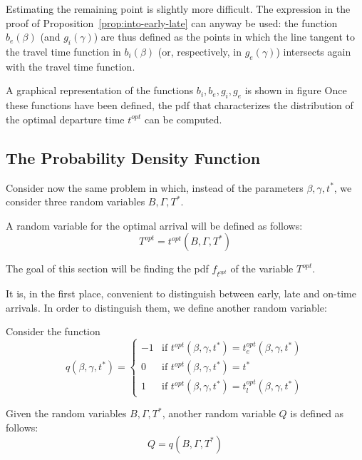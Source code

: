 Estimating the remaining point is slightly more difficult.
The expression in the proof of Proposition~\ref{prop:into-early-late} can anyway be used:
the function \(b_e(\beta)\) (and \(g_i(\gamma)\))
are thus defined as the points in which the line tangent to the travel time function in \(b_i(\beta)\) (or, respectively, in \(g_e(\gamma)\)) intersects again with the travel time function.

A graphical representation of the functions \(b_i, b_e, g_i, g_e\) is shown in figure
Once these functions have been defined,
the pdf that characterizes the distribution of the optimal departure time \(t^{opt}\) can be computed.

\subsection{The Probability Density Function}

Consider now the same problem in which,
instead of the parameters \(\beta, \gamma, t^*\),
we consider three random variables \(B, \Gamma, T^*\).

A random variable for the optimal arrival will be defined as follows:
\begin{equation}
  \label{eq:rv-opt-arr}
  T^{opt} = t^{opt}(B, \Gamma, T^*)
\end{equation}

The goal of this section will be finding the pdf \(f_{t^{opt}}\) of the variable \(T^{opt}\).

It is, in the first place,
convenient to distinguish between early, late and on-time arrivals.
In order to distinguish them, we define another random variable:
\begin{definition}
  Consider the function
  \begin{equation*}
    q(\beta, \gamma, t^*) =
    \begin{cases}
      -1 & \text{if } t^{opt}(\beta, \gamma, t^*) = t_e^{opt}(\beta, \gamma, t^*) \\
      0 & \text{if } t^{opt}(\beta, \gamma, t^*) = t^* \\
      1 & \text{if } t^{opt}(\beta, \gamma, t^*) = t_l^{opt}(\beta, \gamma, t^*)
    \end{cases}
  \end{equation*}

  Given the random variables \(B, \Gamma, T^*\), another random variable \(Q\) is defined as follows:
  \begin{equation*}
    Q  = q(B, \Gamma, T^*)
  \end{equation*}
\end{definition}

